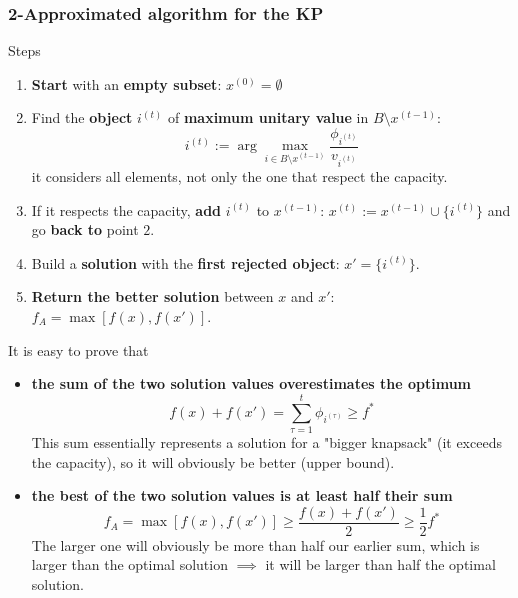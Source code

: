 \documentclass[11pt]{article}
\begin{document}
	\subsubsection{2-Approximated algorithm for the KP}
	Steps
	\begin{enumerate}
		\item \textbf{Start} with an \textbf{empty subset}: $x^{(0)} = \emptyset$
		
		\item Find the \textbf{object} $i^{(t)}$ of \textbf{maximum unitary value} in $B \setminus x^{(t−1)}$:
		$$ i^{(t)} := \arg \max_{i \in B \setminus x^{(t-1)}} \frac{\phi_{i^{(t)}}}{v_{i^{(t)}}}$$
		it considers all elements, not only the one that respect the capacity.\\
		
		\item If it respects the capacity, \textbf{add} $i^{(t)}$ to $x^{(t−1)}$: $x^{(t)} := x^{(t−1)} \cup \{i^{(t)}\}$ and go \textbf{back to} point $2$.\\
		
		\item Build a \textbf{solution} with the \textbf{first rejected object}: $x' = \{i^{(t)}\}$.\\
		
		\item \textbf{Return the better solution} between $x$ and $x'$: $f_A = \max \left[f (x), f (x')\right]$.\\
	\end{enumerate}
	
	
	It is easy to prove that
	\begin{itemize}
		\item \textbf{the sum of the two solution values overestimates the optimum}
		$$ f(x) + f(x') = \sum_{\tau = 1}^{t} \phi_{i^{(\tau)}} \geq f^\ast $$
		This sum essentially represents a solution for a "bigger knapsack" (it exceeds the capacity), so it will obviously be better (upper bound).\\
		
		\item \textbf{the best of the two solution values is at least half their sum}
		$$ f_A = \max \left[ f(x), f(x')\right] \geq \frac{f(x) + f(x')}{2} \geq \frac{1}{2} f^\ast$$
		The larger one will obviously be more than half our earlier sum, which is larger than the optimal solution $\implies$ it will be larger than half the optimal solution.\\
	\end{itemize}
	
\end{document}
